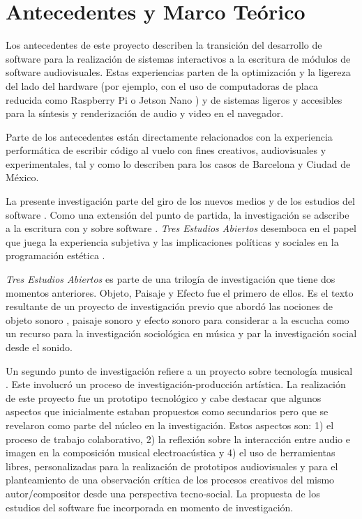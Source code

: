 
\section*{Antecedentes y Marco Teórico}


Los antecedentes de este proyecto describen la transición del desarrollo de software para la realización de sistemas interactivos a la escritura de módulos de software audiovisuales. Estas experiencias parten de la optimización y la ligereza del lado del hardware (por ejemplo, con el uso de computadoras de placa reducida como Raspberry Pi o Jetson Nano ) y de sistemas ligeros y accesibles para la síntesis y renderización de audio y video en el navegador.

Parte de los antecedentes están directamente relacionados con la experiencia performática de escribir código al vuelo con fines creativos, audiovisuales y experimentales, tal y como lo describen \cite{villasenor} para los casos de Barcelona y Ciudad de México. 

La presente investigación parte del giro de los nuevos medios y de los estudios del software \citep{manovichlanguage}. Como una extensión del punto de partida, la investigación se adscribe a la escritura con y sobre software \citep{aestheticProgramming}. \textit{Tres Estudios Abiertos} desemboca en el papel que juega la experiencia subjetiva y las implicaciones políticas y sociales en la programación estética \citep{speakingCode}. 

\textit{Tres Estudios Abiertos} es parte de una trilogía de investigación que tiene dos momentos anteriores. Objeto, Paisaje y Efecto \citep{ocelotlLic} fue el primero de ellos. Es el texto resultante de un proyecto de investigación previo que abordó las nociones de objeto sonoro \citep{schaeffer}, paisaje sonoro\citep{schafer1} y efecto sonoro \citep{augoyard} para considerar a la escucha como un recurso para la investigación sociológica en música y par la investigación social desde el sonido. 

Un segundo punto de investigación refiere a un proyecto sobre tecnología musical \citep{ocelotlMas}. Este involucró un proceso de investigación-producción artística. La realización de este proyecto fue un prototipo tecnológico y cabe destacar que algunos aspectos que inicialmente estaban propuestos como secundarios pero que se revelaron como parte del núcleo en la investigación. Estos aspectos son: 1) el proceso de trabajo colaborativo, 2) la reflexión sobre la interacción entre audio e imagen en la composición musical electroacústica y 4) el uso de herramientas libres, personalizadas para la realización de prototipos audiovisuales y para el planteamiento de una observación crítica de los procesos creativos del mismo autor/compositor desde una perspectiva tecno-social. La propuesta de los estudios del software fue incorporada en momento de investigación. 

